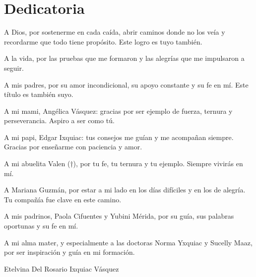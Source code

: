 \chapter*{Dedicatoria}
A Dios, por sostenerme en cada caída, abrir caminos donde no los veía y
recordarme que todo tiene propósito. Este logro es tuyo también.

A la vida, por las pruebas que me formaron y las alegrías que me impulsaron a
seguir.

A mis padres, por su amor incondicional, su apoyo constante y su fe en mí. Este
título es también suyo.

A mi mami, Angélica Vásquez: gracias por ser ejemplo de fuerza, ternura y
perseverancia. Aspiro a ser como tú.

A mi papi, Edgar Ixquiac: tus consejos me guían y me acompañan siempre. Gracias
por enseñarme con paciencia y amor.

A mi abuelita Valen (†), por tu fe, tu ternura y tu ejemplo. Siempre vivirás en
mí.

A Mariana Guzmán, por estar a mi lado en los días difíciles y en los de alegría.
Tu compañía fue clave en este camino.

A mis padrinos, Paola Cifuentes y Yubini Mérida, por su guía, sus palabras
oportunas y su fe en mí.

A mi alma mater, y especialmente a las doctoras Norma Yxquiac y Sucelly Maaz,
por ser inspiración y guía en mi formación. 

\vspace{1cm}

\begin{flushright}
Etelvina Del Rosario Ixquiac Vásquez
\end{flushright}
